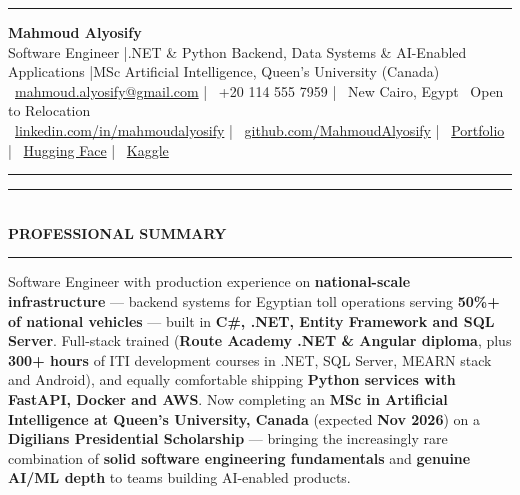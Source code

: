 \documentclass[10pt, a4paper]{article}
\newcommand{\faEnvelope}{}\newcommand{\faPhone}{}\newcommand{\faMapMarker}{}%
\newcommand{\faLinkedin}{}\newcommand{\faGithub}{}\newcommand{\faRobot}{}%
\newcommand{\faChartBar}{}\newcommand{\faGlobe}{}%
\newcommand{\cvsection}[1]{%
  \vspace{3pt}%
  {\color{navy}\rule{\linewidth}{1.1pt}}\\[0.5pt]%
  {\color{navy}\bfseries\fontsize{9.5}{11}\selectfont\uppercase{#1}}\\[-4pt]%
  {\color{teal}\rule{\linewidth}{0.6pt}}%
  \vspace{2pt}%
}
\begin{document}
\small

{\color{navy}\rule{\linewidth}{1.5pt}}

\vspace{3pt}
\begin{center}
  {\fontsize{21}{24}\bfseries\color{navy} Mahmoud Alyosify}\\[3pt]
  {\fontsize{10}{12}\color{teal}
    Software Engineer \enspace|\enspace .NET \& Python Backend, Data Systems \& AI-Enabled Applications
    \enspace|\enspace MSc Artificial Intelligence, Queen's University (Canada)
}\\[4pt]
  {\color{midgray}
    \faEnvelope\ \href{mailto:mahmoud.alyosify@gmail.com}{mahmoud.alyosify@gmail.com}
    \enspace|\enspace
    \faPhone\ +20 114 555 7959
    \enspace|\enspace
    \faMapMarker\ New Cairo, Egypt \textperiodcentered\ Open to Relocation}\\[2pt]
  {\faLinkedin\ \href{https://linkedin.com/in/mahmoudalyosify}{linkedin.com/in/mahmoudalyosify}
    \enspace|\enspace
    \faGithub\ \href{https://github.com/MahmoudAlyosify}{github.com/MahmoudAlyosify}
    \enspace|\enspace
    \faGlobe\ \href{https://mahmoudalyosifysite.github.io/}{Portfolio}
    \enspace|\enspace
    \faRobot\ \href{https://huggingface.co/mahmoudalyosify}{Hugging Face}
    \enspace|\enspace
    \faChartBar\ \href{https://kaggle.com/mahmoudalyosify}{Kaggle}}
\end{center}

{\color{navy}\rule{\linewidth}{1.5pt}}

\vspace{2pt}

\cvsection{Professional Summary}

{\color{darkgray}\justifying
Software Engineer with production experience on \textbf{national-scale infrastructure} --- backend systems for Egyptian toll operations serving \textbf{50\%+ of national vehicles} --- built in \textbf{C\#, .NET, Entity Framework and SQL Server}. Full-stack trained (\textbf{Route Academy .NET \& Angular diploma}, plus \textbf{300+ hours} of ITI development courses in .NET, SQL Server, MEARN stack and Android), and equally comfortable shipping \textbf{Python services with FastAPI, Docker and AWS}. Now completing an \textbf{MSc in Artificial Intelligence at Queen's University, Canada} (expected \textbf{Nov 2026}) on a \textbf{Digilians Presidential Scholarship} --- bringing the increasingly rare combination of \textbf{solid software engineering fundamentals} and \textbf{genuine AI/ML depth} to teams building AI-enabled products.}
\end{document}

